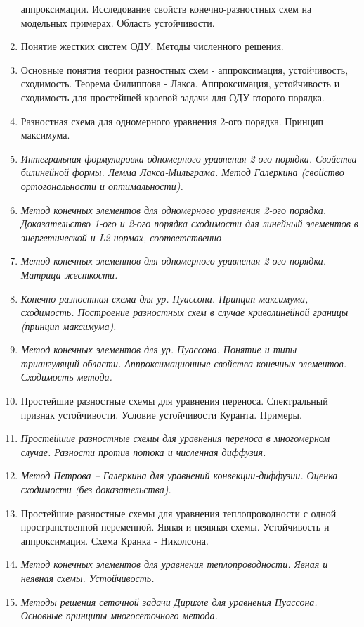 \documentclass[a4paper]{article}
\begin{document}
\begin{enumerate}
  аппроксимации. Исследование свойств конечно-разностных схем на
  модельных примерах. Область устойчивости.
\item {\sf Понятие жестких систем ОДУ. Методы численного решения.}
\item Основные понятия теории разностных схем - аппроксимация,
  устойчивость, сходимость. Теорема Филиппова - Лакса. Аппроксимация,
  устойчивость и сходимость для простейшей краевой задачи для ОДУ
  второго порядка.
\item Разностная схема для одномерного уравнения 2-ого
  порядка. Принцип максимума.
\item {\it Интегральная формулировка одномерного уравнения 2-ого
  порядка. Свойства билинейной формы. Лемма Лакса-Мильграма. Метод
  Галеркина (свойство ортогональности и оптимальности).}
\item {\it Метод конечных элементов для одномерного уравнения 2-ого
  порядка. Доказательство 1-ого и 2-ого порядка сходимости для
  линейный элементов в энергетической и L2-нормах, соответственно}
\item {\it Метод конечных элементов для одномерного уравнения 2-ого
  порядка. Матрица жесткости.}
\item {\it Конечно-разностная схема для ур. Пуассона. Принцип максимума,
  сходимость. Построение разностных схем в случае криволинейной
  границы (принцип максимума).}
\item {\it Метод конечных элементов для ур. Пуассона. Понятие и типы
  триангуляций области. Аппроксимационные свойства конечных
  элементов. Сходимость метода.}
\item Простейшие разностные схемы для уравнения переноса. Спектральный
  признак устойчивости. Условие устойчивости Куранта.  Примеры.
\item {\it Простейшие разностные схемы для уравнения переноса в многомерном
  случае. Разности против потока и численная диффузия.}
\item {\it Метод Петрова – Галеркина для уравнений
  конвекции-диффузии. Оценка сходимости (без доказательства).}
\item Простейшие разностные схемы для уравнения теплопроводности с
  одной пространственной переменной. Явная и неявная
  схемы. Устойчивость и аппроксимация. Схема Кранка - Николсона.
\item { \it Метод конечных элементов для уравнения теплопроводности. Явная и
  неявная схемы. Устойчивость.}
\item {\it Методы решения сеточной задачи Дирихле для уравнения
  Пуассона. Основные принципы многосеточного метода.}
\end{enumerate}
\medskip
\dmvntrail
\end{document}
